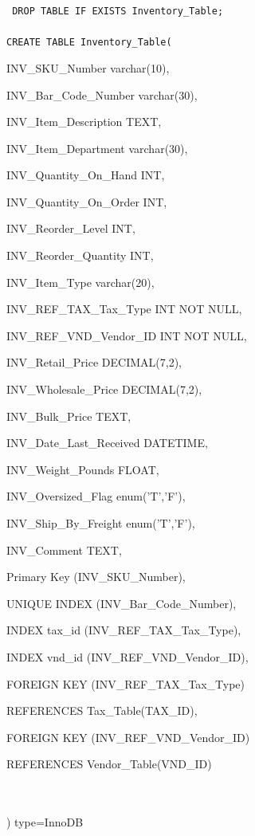 \documentclass{report}
\begin{document}
    	{\tt\small
	DROP TABLE IF EXISTS Inventory\_Table;\\
	\\
	CREATE TABLE Inventory\_Table(\\
	\begin{list}{}
		\item{INV\_SKU\_Number                  varchar(10),}
		\item{INV\_Bar\_Code\_Number             varchar(30),}
		\item{INV\_Item\_Description            TEXT,}
		\item{INV\_Item\_Department             varchar(30),}
		\item{INV\_Quantity\_On\_Hand            INT,}
		\item{INV\_Quantity\_On\_Order           INT,}
		\item{INV\_Reorder\_Level               INT,}
		\item{INV\_Reorder\_Quantity            INT,}
		\item{INV\_Item\_Type                   varchar(20),}
		\item{INV\_REF\_TAX\_Tax\_Type            INT NOT NULL,}
		\item{INV\_REF\_VND\_Vendor\_ID           INT NOT NULL,}
		\item{INV\_Retail\_Price                DECIMAL(7,2),}
		\item{INV\_Wholesale\_Price             DECIMAL(7,2),}
		\item{INV\_Bulk\_Price                  TEXT,}
		\item{INV\_Date\_Last\_Received          DATETIME,}
		\item{INV\_Weight\_Pounds               FLOAT,}
		\item{INV\_Oversized\_Flag              enum('T','F'),}
		\item{INV\_Ship\_By\_Freight             enum('T','F'),}
		\item{INV\_Comment                     TEXT,}
		\item{Primary Key (INV\_SKU\_Number),}
		\item{UNIQUE INDEX (INV\_Bar\_Code\_Number),}
		\item{INDEX tax\_id (INV\_REF\_TAX\_Tax\_Type),}
		\item{INDEX vnd\_id (INV\_REF\_VND\_Vendor\_ID),}
		\item{FOREIGN KEY (INV\_REF\_TAX\_Tax\_Type)}
		\item{REFERENCES Tax\_Table(TAX\_ID),}
		\item{FOREIGN KEY (INV\_REF\_VND\_Vendor\_ID)}
		\item{REFERENCES Vendor\_Table(VND\_ID)}
	\end{list}\\
	\\
	) type=InnoDB
	}
\end{document}
